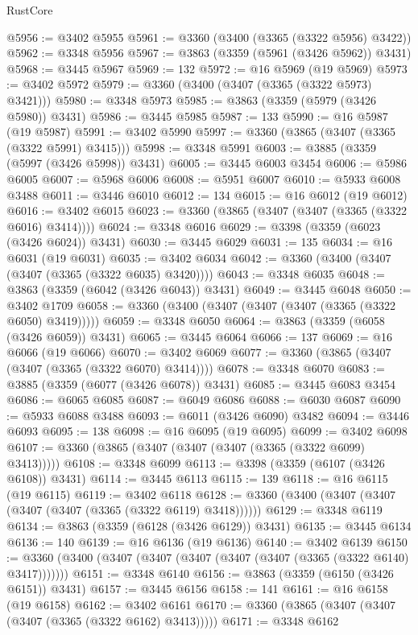 \begin{lexlean}{RustCore}
\begin{coremodule}
@5956 := @3402 @5955
@5961 := @3360 (@3400 (@3365 (@3322 @5956) @3422))
@5962 := @3348 @5956
@5967 := @3863 (@3359 (@5961 (@3426 @5962)) @3431)
@5968 := @3445 @5967
@5969 := 132
@5972 := @16 @5969 (@19 @5969)
@5973 := @3402 @5972
@5979 := @3360 (@3400 (@3407 (@3365 (@3322 @5973) @3421)))
@5980 := @3348 @5973
@5985 := @3863 (@3359 (@5979 (@3426 @5980)) @3431)
@5986 := @3445 @5985
@5987 := 133
@5990 := @16 @5987 (@19 @5987)
@5991 := @3402 @5990
@5997 := @3360 (@3865 (@3407 (@3365 (@3322 @5991) @3415)))
@5998 := @3348 @5991
@6003 := @3885 (@3359 (@5997 (@3426 @5998)) @3431)
@6005 := @3445 @6003 @3454
@6006 := @5986 @6005
@6007 := @5968 @6006
@6008 := @5951 @6007
@6010 := @5933 @6008 @3488
@6011 := @3446 @6010
@6012 := 134
@6015 := @16 @6012 (@19 @6012)
@6016 := @3402 @6015
@6023 := @3360 (@3865 (@3407 (@3407 (@3365 (@3322 @6016) @3414))))
@6024 := @3348 @6016
@6029 := @3398 (@3359 (@6023 (@3426 @6024)) @3431)
@6030 := @3445 @6029
@6031 := 135
@6034 := @16 @6031 (@19 @6031)
@6035 := @3402 @6034
@6042 := @3360 (@3400 (@3407 (@3407 (@3365 (@3322 @6035) @3420))))
@6043 := @3348 @6035
@6048 := @3863 (@3359 (@6042 (@3426 @6043)) @3431)
@6049 := @3445 @6048
@6050 := @3402 @1709
@6058 := @3360 (@3400 (@3407 (@3407 (@3407 (@3365 (@3322 @6050) @3419)))))
@6059 := @3348 @6050
@6064 := @3863 (@3359 (@6058 (@3426 @6059)) @3431)
@6065 := @3445 @6064
@6066 := 137
@6069 := @16 @6066 (@19 @6066)
@6070 := @3402 @6069
@6077 := @3360 (@3865 (@3407 (@3407 (@3365 (@3322 @6070) @3414))))
@6078 := @3348 @6070
@6083 := @3885 (@3359 (@6077 (@3426 @6078)) @3431)
@6085 := @3445 @6083 @3454
@6086 := @6065 @6085
@6087 := @6049 @6086
@6088 := @6030 @6087
@6090 := @5933 @6088 @3488
@6093 := @6011 (@3426 @6090) @3482
@6094 := @3446 @6093
@6095 := 138
@6098 := @16 @6095 (@19 @6095)
@6099 := @3402 @6098
@6107 := @3360 (@3865 (@3407 (@3407 (@3407 (@3365 (@3322 @6099) @3413)))))
@6108 := @3348 @6099
@6113 := @3398 (@3359 (@6107 (@3426 @6108)) @3431)
@6114 := @3445 @6113
@6115 := 139
@6118 := @16 @6115 (@19 @6115)
@6119 := @3402 @6118
@6128 := @3360 (@3400 (@3407 (@3407 (@3407 (@3407 (@3365 (@3322 @6119) @3418))))))
@6129 := @3348 @6119
@6134 := @3863 (@3359 (@6128 (@3426 @6129)) @3431)
@6135 := @3445 @6134
@6136 := 140
@6139 := @16 @6136 (@19 @6136)
@6140 := @3402 @6139
@6150 := @3360 (@3400 (@3407 (@3407 (@3407 (@3407 (@3407 (@3365 (@3322 @6140) @3417)))))))
@6151 := @3348 @6140
@6156 := @3863 (@3359 (@6150 (@3426 @6151)) @3431)
@6157 := @3445 @6156
@6158 := 141
@6161 := @16 @6158 (@19 @6158)
@6162 := @3402 @6161
@6170 := @3360 (@3865 (@3407 (@3407 (@3407 (@3365 (@3322 @6162) @3413)))))
@6171 := @3348 @6162

\end{coremodule}
\end{lexlean}
